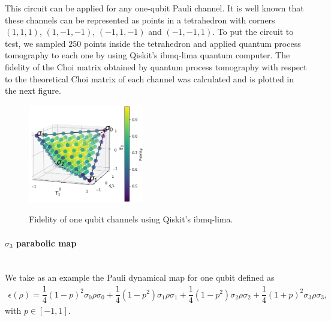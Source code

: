 This circuit can be applied for any one-qubit Pauli channel. It is well known that these channels can be represented as points in a tetrahedron with corners $(1,1,1)$, $(1,-1,-1)$, $(-1,1,-1)$ and $(-1,-1,1)$. To put the circuit to test, we sampled $250$ points inside the tetrahedron and applied quantum process tomography to each one by using Qiskit's ibmq-lima quantum computer. The fidelity of the Choi matrix obtained by quantum process tomography with respect to the theoretical Choi matrix of each channel was calculated and is plotted in the next figure. 



\begin{figure}[h!]
\centering
\includegraphics[width=0.45\textwidth]{fidelity-points.png}\\
\caption{Fidelity of one qubit channels using Qiskit's ibmq-lima.}
\end{figure}


\paragraph{$\sigma_3$ parabolic map} $\;$ \\

We take as an example the Pauli dynamical map for one qubit defined as
\begin{eqnarray}
\epsilon(\rho) = \dfrac{1}{4} (1-p)^2 \sigma_0 \rho \sigma_0 + \dfrac{1}{4} (1-p^2) \sigma_1 \rho \sigma_1 + \dfrac{1}{4} (1-p^2) \sigma_2 \rho \sigma_2 + \dfrac{1}{4} (1+p)^2 \sigma_3 \rho \sigma_3 ,
\end{eqnarray}
with $p \in [-1,1]$. \\

